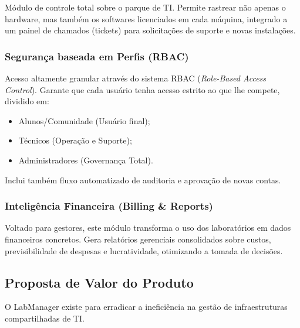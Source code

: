 \documentclass[12pt,a4paper]{article}
\begin{document}
	Módulo de controle total sobre o parque de TI. Permite rastrear não apenas o hardware, mas também os softwares licenciados em cada máquina, integrado a um painel de chamados (tickets) para solicitações de suporte e novas instalações.
	
	
	\subsubsection{Segurança baseada em Perfis (RBAC)}
	
	Acesso altamente granular através do sistema RBAC (\textit{Role-Based Access Control}). Garante que cada usuário tenha acesso estrito ao que lhe compete, dividido em:
	
	\begin{itemize}
		\item Alunos/Comunidade (Usuário final);
		\item Técnicos (Operação e Suporte);
		\item Administradores (Governança Total).
	\end{itemize}
	
	Inclui também fluxo automatizado de auditoria e aprovação de novas contas.
	
	
	\subsubsection{Inteligência Financeira (Billing \& Reports)}
	
	Voltado para gestores, este módulo transforma o uso dos laboratórios em dados financeiros concretos. Gera relatórios gerenciais consolidados sobre custos, previsibilidade de despesas e lucratividade, otimizando a tomada de decisões.
	
	
	\subsection{Proposta de Valor do Produto}
	
	O LabManager existe para erradicar a ineficiência na gestão de infraestruturas compartilhadas de TI. 
	
\end{document}
